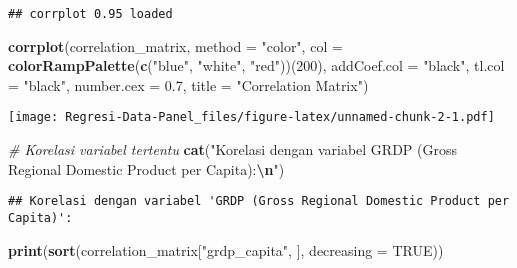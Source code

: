 \documentclass[
]{article}
\newenvironment{Shaded}{\begin{snugshade}}{\end{snugshade}}
\newcommand{\AttributeTok}[1]{\textcolor[rgb]{0.13,0.29,0.53}{#1}}
\newcommand{\CommentTok}[1]{\textcolor[rgb]{0.56,0.35,0.01}{\textit{#1}}}
\newcommand{\ConstantTok}[1]{\textcolor[rgb]{0.56,0.35,0.01}{#1}}
\newcommand{\DecValTok}[1]{\textcolor[rgb]{0.00,0.00,0.81}{#1}}
\newcommand{\FloatTok}[1]{\textcolor[rgb]{0.00,0.00,0.81}{#1}}
\newcommand{\FunctionTok}[1]{\textcolor[rgb]{0.13,0.29,0.53}{\textbf{#1}}}
\newcommand{\NormalTok}[1]{#1}
\newcommand{\SpecialCharTok}[1]{\textcolor[rgb]{0.81,0.36,0.00}{\textbf{#1}}}
\newcommand{\StringTok}[1]{\textcolor[rgb]{0.31,0.60,0.02}{#1}}
\begin{document}
\begin{verbatim}
## corrplot 0.95 loaded
\end{verbatim}

\begin{Shaded}
\begin{Highlighting}[]
\FunctionTok{corrplot}\NormalTok{(correlation\_matrix, }\AttributeTok{method =} \StringTok{"color"}\NormalTok{, }\AttributeTok{col =} \FunctionTok{colorRampPalette}\NormalTok{(}\FunctionTok{c}\NormalTok{(}\StringTok{"blue"}\NormalTok{, }\StringTok{"white"}\NormalTok{, }\StringTok{"red"}\NormalTok{))(}\DecValTok{200}\NormalTok{), }\AttributeTok{addCoef.col =} \StringTok{"black"}\NormalTok{, }\AttributeTok{tl.col =} \StringTok{"black"}\NormalTok{, }\AttributeTok{number.cex =} \FloatTok{0.7}\NormalTok{, }\AttributeTok{title =} \StringTok{"Correlation Matrix"}\NormalTok{)}
\end{Highlighting}
\end{Shaded}

\texttt{[image: Regresi-Data-Panel\_files/figure-latex/unnamed-chunk-2-1.pdf]}

\begin{Shaded}
\begin{Highlighting}[]
\CommentTok{\# Korelasi variabel tertentu}
\FunctionTok{cat}\NormalTok{(}\StringTok{"Korelasi dengan variabel \textquotesingle{}GRDP (Gross Regional Domestic Product per Capita)\textquotesingle{}:}\SpecialCharTok{\textbackslash{}n}\StringTok{"}\NormalTok{)}
\end{Highlighting}
\end{Shaded}

\begin{verbatim}
## Korelasi dengan variabel 'GRDP (Gross Regional Domestic Product per Capita)':
\end{verbatim}

\begin{Shaded}
\begin{Highlighting}[]
\FunctionTok{print}\NormalTok{(}\FunctionTok{sort}\NormalTok{(correlation\_matrix[}\StringTok{"grdp\_capita"}\NormalTok{, ], }\AttributeTok{decreasing =} \ConstantTok{TRUE}\NormalTok{))}
\end{Highlighting}
\end{Shaded}
\end{document}
